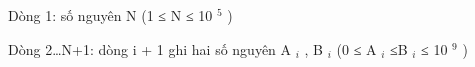 Dòng 1: số nguyên N (1 ≤ N ≤ 10 $^ 5 $ )

Dòng 2…N+1: dòng i + 1 ghi hai số nguyên A $_ i $ , B $_ i $ (0 ≤ A $_ i $ ≤B $_ i $ ≤ 10 $^ 9 $ )

\